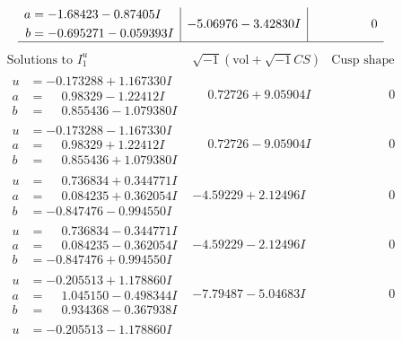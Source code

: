 \documentclass[1p]{elsarticle_modified}
\theoremstyle{definition}
\newcommand{\I}{\sqrt{-1}}
\begin{document}
$$\begin{array}{c|c|c}
\begin{aligned}
a &= -1.68423 - 0.87405 I \\
b &= -0.695271 - 0.059393 I\end{aligned}
 & -5.06976 - 3.42830 I & \phantom{-0.000000 } 0\\
 \hline 
 \end{array}$$\newpage$$\begin{array}{c|c|c}  
\text{Solutions to }I^u_{1}& \I (\text{vol} + \sqrt{-1}CS) & \text{Cusp shape}\\
 \hline 
\begin{aligned}
u &= -0.173288 + 1.167330 I \\
a &= \phantom{-}0.98329 - 1.22412 I \\
b &= \phantom{-}0.855436 - 1.079380 I\end{aligned}
 & \phantom{-}0.72726 + 9.05904 I & \phantom{-0.000000 } 0 \\ \hline\begin{aligned}
u &= -0.173288 - 1.167330 I \\
a &= \phantom{-}0.98329 + 1.22412 I \\
b &= \phantom{-}0.855436 + 1.079380 I\end{aligned}
 & \phantom{-}0.72726 - 9.05904 I & \phantom{-0.000000 } 0 \\ \hline\begin{aligned}
u &= \phantom{-}0.736834 + 0.344771 I \\
a &= \phantom{-}0.084235 + 0.362054 I \\
b &= -0.847476 - 0.994550 I\end{aligned}
 & -4.59229 + 2.12496 I & \phantom{-0.000000 } 0 \\ \hline\begin{aligned}
u &= \phantom{-}0.736834 - 0.344771 I \\
a &= \phantom{-}0.084235 - 0.362054 I \\
b &= -0.847476 + 0.994550 I\end{aligned}
 & -4.59229 - 2.12496 I & \phantom{-0.000000 } 0 \\ \hline\begin{aligned}
u &= -0.205513 + 1.178860 I \\
a &= \phantom{-}1.045150 - 0.498344 I \\
b &= \phantom{-}0.934368 - 0.367938 I\end{aligned}
 & -7.79487 - 5.04683 I & \phantom{-0.000000 } 0 \\ \hline\begin{aligned}
u &= -0.205513 - 1.178860 I \\

\end{aligned}
\end{array}$$
\end{document}
